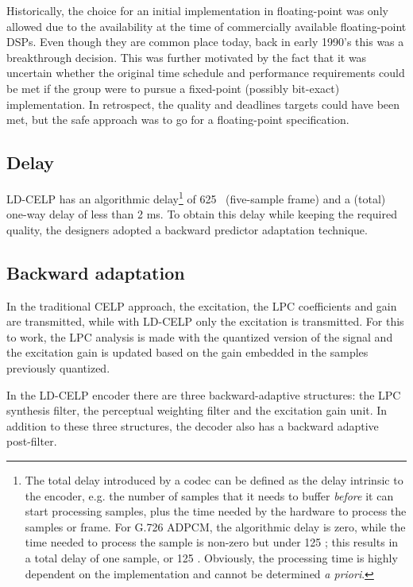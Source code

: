 Historically, the choice for an initial implementation in floating-point was only allowed due to the availability at the time of
commercially available floating-point DSPs. Even though they are
common place today, back in early 1990's this was a breakthrough
decision. This was further motivated by the fact that it was uncertain
whether the original time schedule and performance requirements could
be met if the group were to pursue a fixed-point (possibly bit-exact)
implementation. In retrospect, the quality and deadlines targets could
have been met, but the safe approach was to go for a floating-point
specification.


\subsection{Delay} 

LD-CELP has an algorithmic delay\footnote{\sf The total delay
  introduced by a codec can be defined as the delay intrinsic to the
  encoder, e.g. the number of samples that it needs to buffer {\em
    before} it can start processing samples, plus the time needed by
  the hardware to process the samples or frame. For G.726 ADPCM, the
  algorithmic delay is zero, while the time needed to process the
  sample is non-zero but under 125 \us ; this results in a total delay
  of one sample, or 125 \us. Obviously, the processing time is highly
  dependent on the implementation and cannot be determined {\em a
    priori}.}  of 625 \us ~(five-sample frame) and a (total) one-way
delay of less than 2 ms. To obtain this delay while keeping the
required quality, the designers adopted a backward predictor
adaptation technique.

\subsection{Backward adaptation}

In the traditional CELP approach, the excitation, the LPC coefficients
and gain are transmitted, while with LD-CELP only the excitation is
transmitted. For this to work, the LPC analysis is made with the
quantized version of the signal and the excitation gain is updated
based on the gain embedded in the samples previously quantized.

In the LD-CELP encoder there are three backward-adaptive structures:
the LPC synthesis filter, the perceptual weighting filter and the
excitation gain unit. In addition to these three structures, the
decoder also has a backward adaptive post-filter.

